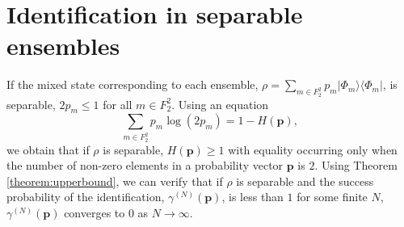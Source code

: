 \documentclass[aps,prx,twocolumn,showpacs,amsmath,notitlepage,amssymb,superscriptaddress]{revtex4-1}
\newcommand{\bra}[1]{\langle {#1} |}
\newcommand{\ket}[1]{| {#1} \rangle}
\begin{document}
\section{Identification in separable ensembles}
\label{appendix:mixed}
If the mixed state corresponding to each ensemble, $\rho=\sum_{m\in F_2^2}p_m\ket{\Phi_m}\bra{\Phi_m}$, is separable, $2p_m\leq 1$ for all $m\in F_2^2$. Using an equation
\begin{equation}
\label{eq:relativeentropy}
 \sum_{m\in F_2^2}p_m\log (2p_m)=1-H(\mathbf{p}),
\end{equation}
we obtain that if $\rho$ is separable, $H(\mathbf{p})\geq 1$ with equality occurring only when the number of non-zero elements in a probability vector $\mathbf{p}$ is $2$. Using Theorem \ref{theorem:upperbound}, we can verify that if $\rho$ is separable and the success probability of the identification, $\gamma^{(N)}(\mathbf{p})$, is less than $1$ for some finite $N$, $\gamma^{(N)}(\mathbf{p})$ converges to $0$ as $N\rightarrow \infty$.

\nocite{*}


\end{document}

